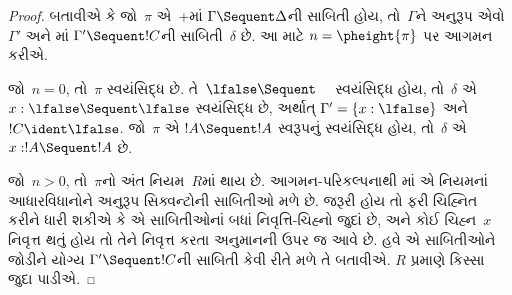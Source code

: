 \begin{proof}
  બતાવીએ કે જો~$\pi$
  એ~+\Cut{}માં
  $\Gamma \Sequent \Delta$ની
  સાબિતી હોય,
  તો~$\Gamma$ને અનુરૂપ
  એવો~$\Gamma'$ અને
  માં
  $\Gamma' \Sequent !C$ની
  સાબિતી~$\delta$
  છે.
  આ માટે
  $n = \pheight{\pi}$
  પર આગમન કરીએ.

  જો~$n = 0$, તો~$\pi$
  સ્વયંસિદ્ધ છે.
  તે~$\lfalse \Sequent
  \quad$ સ્વયંસિદ્ધ હોય,
  તો~$\delta$ એ
  $x:\lfalse \Sequent \lfalse$
  સ્વયંસિદ્ધ છે,
  અર્થાત્
  $\Gamma' = \{x:\lfalse\}$
  અને~$!C \ident \lfalse$.
  જો~$\pi$ એ
  $!A \Sequent !A$
  સ્વરૂપનું સ્વયંસિદ્ધ
  હોય, તો~$\delta$
  એ~$x: !A \Sequent !A$ છે.
  
  જો~$n>0$, તો~$\pi$નો
  અંત નિયમ~$R$માં થાય છે.
  આગમન-પરિકલ્પનાથી
  માં એ
  નિયમનાં આધારવિધાનોને
  અનુરૂપ સિક્વન્ટોની
  સાબિતીઓ મળે છે.
  જરૂરી હોય તો ફરી
  ચિહ્નિત કરીને ધારી
  શકીએ કે એ સાબિતીઓનાં
  બધાં નિવૃત્તિ-ચિહ્નો
  જુદાં છે, અને
  કોઈ ચિહ્ન~$x$
  નિવૃત્ત થતું હોય
  તો તેને નિવૃત્ત કરતા
  અનુમાનની ઉપર જ
  આવે છે.
  હવે એ સાબિતીઓને
  જોડીને યોગ્ય
  $\Gamma' \Sequent !C$ની
  સાબિતી કેવી રીતે
  મળે તે બતાવીએ.
  $R$ પ્રમાણે કિસ્સા
  જુદા પાડીએ.


\end{proof}
